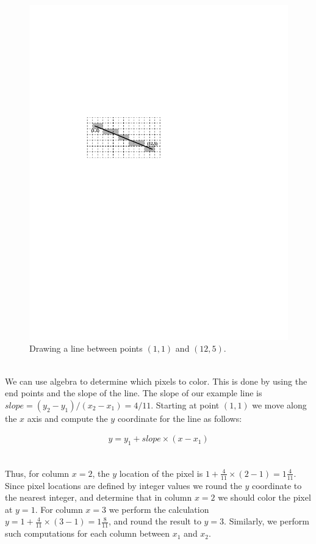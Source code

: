 \documentclass[epsfig,10pt,fullpage]{article}
\begin{document}
\begin{figure}[b]
   \begin{center}
       \includegraphics{figures/fig_line_drawing}
   \end{center}
   \caption{Drawing a line between points $(1,1)$ and $(12,5)$.}
	\label{fig:line_drawing}
\end{figure}

~\\
\noindent
We can use algebra to determine which pixels to color. This is done by using the end points and 
the slope of the line. The slope of our example line is $slope = (y_2 - y_1)/(x_2 - x_1) = 4/11$. 
Starting at point $(1,1)$ we move along the $x$ axis and compute the $y$ coordinate for the 
line as follows:

\begin{eqnarray*}
y = y_1 + slope \times (x - x_1)
\end{eqnarray*}

~\\
\noindent
Thus, for column $x = 2$, the $y$ location of the pixel is
$1 + \frac{4}{11} \times (2-1) = 1 \frac{4}{11}$. 
Since pixel locations are defined by integer values we round the $y$ coordinate to the nearest 
integer, and determine that in column $x = 2$ we should color the pixel at $y = 1$. For
column $x = 3$ we perform the calculation $y = 1 + \frac{4}{11} \times (3-1) = 1
\frac{8}{11}$, and round the result to $y = 3$.  Similarly, we perform such computations 
for each column between $x_1$ and $x_2$.
\end{document}
